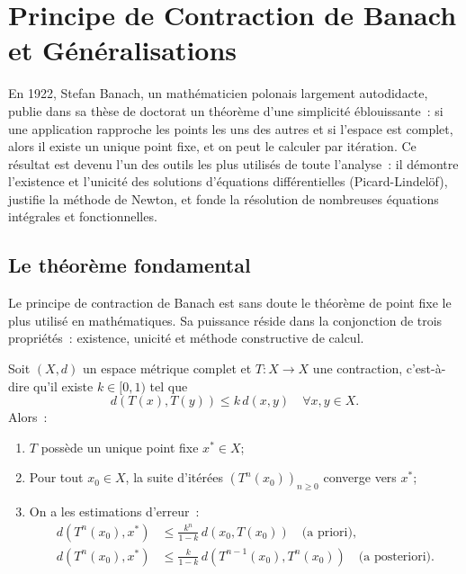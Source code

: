\chapter{Principe de Contraction de Banach et G\'en\'eralisations}\label{ch:banach}

En 1922, Stefan Banach, un math\'ematicien polonais largement autodidacte,
publie dans sa th\`ese de doctorat un th\'eor\`eme d'une simplicit\'e
\'eblouissante~: si une application \og rapproche\fg{} les points les uns
des autres et si l'espace est complet, alors il existe un unique point fixe,
et on peut le calculer par it\'eration. Ce r\'esultat est devenu l'un des
outils les plus utilis\'es de toute l'analyse~: il d\'emontre l'existence et
l'unicit\'e des solutions d'\'equations diff\'erentielles (Picard-Lindel\"of),
justifie la m\'ethode de Newton, et fonde la r\'esolution de nombreuses
\'equations int\'egrales et fonctionnelles.

\section{Le th\'eor\`eme fondamental}

Le principe de contraction de Banach est sans doute le th\'eor\`eme de point fixe
le plus utilis\'e en math\'ematiques. Sa puissance r\'eside dans la conjonction de
trois propri\'et\'es~: existence, unicit\'e et m\'ethode constructive de calcul.

\begin{theoreme}\label{thm:banach}
Soit $(X, d)$ un espace m\'etrique complet et $T : X \to X$ une contraction,
c'est-\`a-dire qu'il existe $k \in [0, 1)$ tel que
\[
    d(T(x), T(y)) \leq k \, d(x, y) \quad \forall x, y \in X.
\]
Alors~:
\begin{enumerate}
    \item $T$ poss\`ede un unique point fixe $x^* \in X$;
    \item Pour tout $x_0 \in X$, la suite d'it\'er\'ees $(T^n(x_0))_{n \geq 0}$
          converge vers $x^*$;
    \item On a les estimations d'erreur~:
    \begin{align}
        d(T^n(x_0), x^*) &\leq \frac{k^n}{1 - k} \, d(x_0, T(x_0))
        \quad \text{(a priori)}, \label{eq:apriori} \\
        d(T^n(x_0), x^*) &\leq \frac{k}{1 - k} \, d(T^{n-1}(x_0), T^n(x_0))
        \quad \text{(a posteriori)}. \label{eq:aposteriori}
    \end{align}
\end{enumerate}
\end{theoreme}

